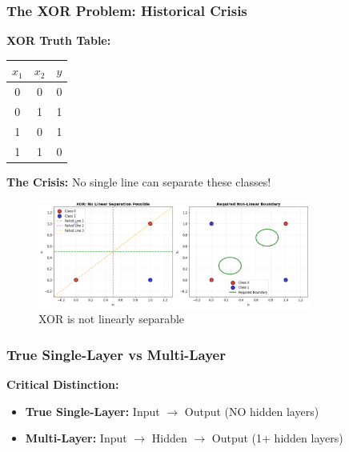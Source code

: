 \documentclass[notes]{beamer}
\begin{document}
\begin{frame}
\begin{frame}
\frametitle{The XOR Problem: Historical Crisis}

\textbf{XOR Truth Table:}
\begin{center}
\begin{tabular}{cc|c}
$x_1$ & $x_2$ & $y$ \\
\hline
0 & 0 & 0 \\
0 & 1 & 1 \\
1 & 0 & 1 \\
1 & 1 & 0 \\
\end{tabular}
\end{center}

\textbf{The Crisis:} No single line can separate these classes!

\begin{figure}[ht]
	\centering
	\includegraphics[width=0.8\textwidth]{figs/xor-problem.png}
	\caption*{XOR is not linearly separable}
\end{figure}

\end{frame}

\begin{frame}
\frametitle{True Single-Layer vs Multi-Layer}

\textbf{Critical Distinction:}
\begin{itemize}
\item \textbf{True Single-Layer:} Input $\to$ Output (NO hidden layers)
\item \textbf{Multi-Layer:} Input $\to$ Hidden $\to$ Output (1+ hidden layers)
\end{itemize}



\end{frame}
\end{frame}
\end{document}

